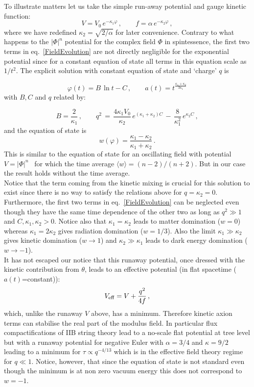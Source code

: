 \documentclass[11pt,a4paper]{article}
\newcommand{\be}{\begin{equation}}
\newcommand{\ee}{\end{equation}}
\begin{document}
To illustrate matters let us take the  simple  run-away potential and gauge kinetic function:
\begin{equation}
\label{eq:RunAwayPotential}
V =V_0  \,e^{-\kappa_1\varphi} \,, \qquad f=\alpha\, e^{-\kappa_2\varphi} \,,
\end{equation}
where we have redefined $\kappa_2 = \sqrt{2/\alpha}$ for later convenience. Contrary to what happens to the $|\Phi|^n$ potential  for the complex field $\Phi$ in spintessence, the first two terms in eq.~\eqref{FieldEvolution} are not directly negligible for the exponential potential since for a constant equation of state all terms in this equation scale as $1/t^2$. The explicit solution with constant equation of state and `charge' $q$ is 

\be
\varphi(t)=B\, \ln t - C\,, \qquad a(t)=t^{\frac{\kappa_1+\kappa_2}{3\kappa_1}} 
\ee
with $B,C$ and $q$ related by:

\be
B=\frac{2}{\kappa_1}\,, \qquad   q^2\, =\, \frac{4\kappa_1 V_0}{\kappa_2}\, e^{(\kappa_1+\kappa_2)C}\, -\,  \frac{8}{\kappa_1^2}\,  e^{\kappa_2 C}\,,
\ee
and the equation of state is
\begin{equation}
w(\varphi) = \frac{\kappa_1-\kappa_2}{\kappa_1 +\kappa_ 2} \,.
\end{equation}
This is  similar to the  equation of state  for an oscillating field with  potential $V=|\Phi|^n$~\cite{0805.1748} for which the time average $\langle w\rangle=(n-2)/(n+2)$. But in our case the result holds without the time average.\\

Notice that the term coming from the kinetic mixing is crucial for this solution to exist since there is no way to satisfy the relations above for $q=\kappa_2=0$. Furthermore, the first two terms in eq.~\eqref{FieldEvolution} can be neglected even though they have the same time dependence of the other two as long as $q^2\gg 1$ and $C,\kappa_1,\kappa_2>0$.  Notice also that $\kappa_1=\kappa_2$ leads to matter domination ($w = 0$) whereas $\kappa_1=2\kappa_2$ gives radiation domination ($w = 1/3$). Also the limit $\kappa_1\gg \kappa_2$ gives kinetic domination ($w \rightarrow 1$) and $\kappa_2 \gg \kappa_1$ leads to dark energy domination ($w \rightarrow -1$).\\
 
It has not escaped our notice that this runaway potential, once dressed with the kinetic contribution from $\theta$, leads to an effective potential (in flat spacetime ($a(t)$=constant)):
\be
V_{\rm eff} = V+ \frac{q^2}{4f} \,,
\ee
 which, unlike the runaway $V$ above, has a minimum. Therefore kinetic axion terms can stabilise the real part of the modulus field. In particular  flux compactifications of IIB string theory lead to a no-scale flat potential at tree level but with a runaway potential for negative Euler with $\alpha=3/4$ and $\kappa=9/2$ leading to a minimum for $\tau\propto q^{-4/13}$ which is in the effective field theory regime for $q\ll 1$. Notice, however, that since the equation of state is not standard even though the minimum is at non zero vacuum energy this does not correspond to $w=-1$.\\
 
\end{document}
